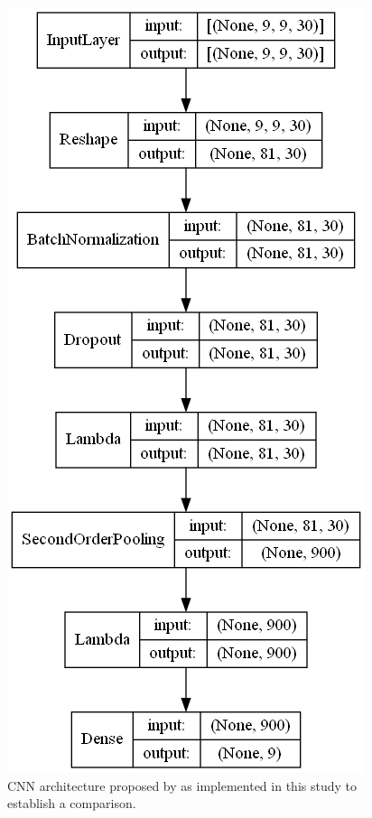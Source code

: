 \begin{figure}[bp]
    \centering
    \includegraphics[width=\linewidth]{figs/vineyard_classification/networks/aspn_9x8_32.png}
	\caption{CNN architecture proposed by \cite{xue_attention-based_2021} as implemented in this study to establish a comparison. }
	\label{fig:aspn_cnn}
\end{figure}